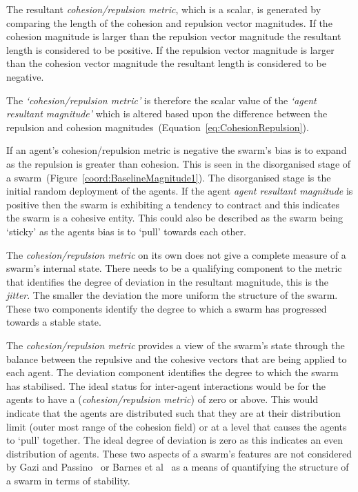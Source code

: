 \documentclass{ieeeaccess}
\begin{document}
The resultant \emph{cohesion/repulsion metric}, which is a scalar, is generated by comparing the length of the cohesion and repulsion vector magnitudes. If the cohesion magnitude is larger than the repulsion vector magnitude the resultant length is considered to be positive. If the repulsion vector magnitude is larger than the cohesion vector magnitude the resultant length is considered to be negative. 

The \emph{`cohesion/repulsion metric'} is therefore the scalar value of the \emph{`agent resultant magnitude'} which is altered based upon the difference between the repulsion and cohesion magnitudes~(Equation~\ref{eq:CohesionRepulsion}).

If an agent's {cohesion/repulsion metric} is negative the swarm's bias is to expand as the repulsion is greater than cohesion. This is seen in the disorganised stage of a swarm~(Figure~\ref{coord:BaselineMagnitude1}). The disorganised stage is the initial random deployment of the agents. If the agent \emph{agent resultant magnitude} is positive then the swarm is exhibiting a tendency to contract and this indicates the swarm is a cohesive entity. This could also be described as the swarm being `sticky' as the agents bias is to `pull' towards each other.

The \emph{cohesion/repulsion metric} on its own does not give a complete measure of a swarm's internal state. There needs to be a qualifying component to the metric that identifies the degree of deviation in the resultant magnitude, this is the \emph{jitter}. The smaller the deviation the more uniform the structure of the swarm. These two components identify the degree to which a swarm has progressed towards a stable state.
 
The \emph{cohesion/repulsion metric} provides a view of the swarm's state through the balance between the repulsive and the cohesive vectors that are being applied to each agent. The deviation component identifies the degree to which the swarm has stabilised. The ideal status for inter-agent interactions would be for the agents to have a (\emph{cohesion/repulsion metric}) of zero or above. This would indicate that the agents are distributed such that they are at their distribution limit (outer most range of the cohesion field) or at a level that causes the agents to `pull' together. The ideal degree of deviation is zero as this indicates an even distribution of agents. These two aspects of a swarm's features are not considered by Gazi and Passino~\cite{GP:11} or Barnes et al~\cite{BFV:07} as a means of quantifying the structure of a swarm in terms of stability.
\end{document}
